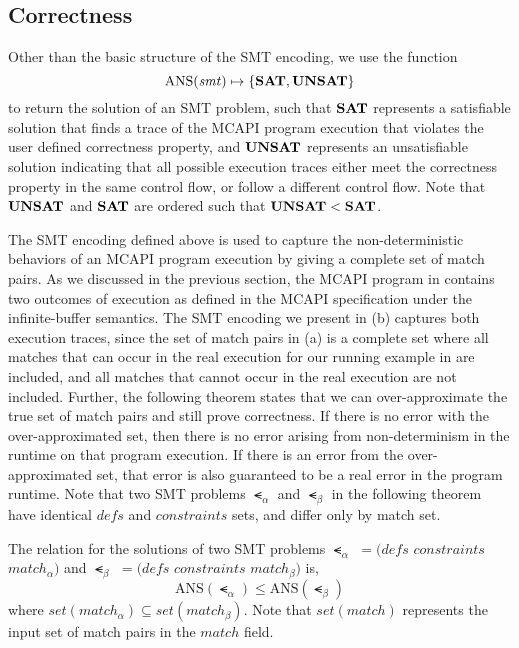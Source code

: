 \subsection{Correctness}

Other than the basic structure of the SMT encoding, we use the
function
\[\mathrm{ANS}(\mathit{smt}) \mapsto \{\mathrm{\textbf{SAT}},\mathrm{\textbf{UNSAT}}\} \]
to return the solution of an SMT problem, such that
$\mathrm{\textbf{SAT}}$ represents a satisfiable solution that finds a
trace of the MCAPI program execution that violates the user defined
correctness property, and $\mathrm{\textbf{UNSAT}}$ represents an
unsatisfiable solution indicating that all possible execution traces
either meet the correctness property in the same control flow, or
follow a different control flow. Note that $\mathrm{\textbf{UNSAT}}$ and
$\mathrm{\textbf{SAT}}$ are ordered such that $\mathrm{\textbf{UNSAT}} <
\mathrm{\textbf{SAT}}$.

The SMT encoding defined above is used to capture the
non-deterministic behaviors of an MCAPI program execution by giving a
complete set of match pairs. As we discussed in the previous section,
the MCAPI program in  contains two outcomes of
execution as defined in the MCAPI specification under the
infinite-buffer semantics. The SMT encoding we present in
(b) captures both execution traces, since the set of
match pairs in (a) is a complete set where all matches
that can occur in the real execution for our running example in
 are included, and all matches that cannot occur in
the real execution are not included. Further, the following theorem
states that we can over-approximate the true set of match pairs and
still prove correctness. If there is no error with the
over-approximated set, then there is no error arising from
non-determinism in the runtime on that program execution. If there is
an error from the over-approximated set, that error is also guaranteed
to be a real error in the program runtime. Note that two SMT problems
$\smt_{\alpha}$ and $\smt_{\beta}$ in the following theorem have
identical $\mathit{defs}$ and $\mathit{constraints}$ sets, and differ
only by match set.

\begin{theorem}
The relation for the solutions of two SMT problems $\smt_{\alpha}$ $= (\mathit{defs}$ $\mathit{constraints}$ $\mathit{match}_{\alpha})$ and $\smt_{\beta}$ $= (\mathit{defs}$ $\mathit{constraints}$ $\mathit{match_{\beta}})$ is,
\[\mathrm{ANS}(\smt_{\alpha}) \leq \mathrm{ANS}(\smt_{\beta})\]
where $\mathit{set(match_{\alpha})} \subseteq \mathit{set(match_{\beta})}$. Note that $\mathit{set(match)}$ represents the input set of match pairs in the $\mathit{match}$ field.
\label{thm:1}
\end{theorem}

